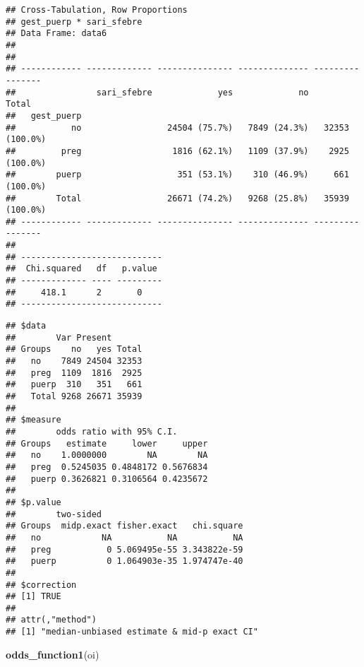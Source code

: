 \documentclass[
]{article}
\newenvironment{Shaded}{\begin{snugshade}}{\end{snugshade}}
\newcommand{\KeywordTok}[1]{\textcolor[rgb]{0.13,0.29,0.53}{\textbf{#1}}}
\newcommand{\NormalTok}[1]{#1}
\newcommand{\OperatorTok}[1]{\textcolor[rgb]{0.81,0.36,0.00}{\textbf{#1}}}
\newcommand{\StringTok}[1]{\textcolor[rgb]{0.31,0.60,0.02}{#1}}
\begin{document}
\begin{verbatim}
## Cross-Tabulation, Row Proportions  
## gest_puerp * sari_sfebre  
## Data Frame: data6  
## 
## 
## ------------ ------------- --------------- -------------- ----------------
##                sari_sfebre             yes             no            Total
##   gest_puerp                                                              
##           no                 24504 (75.7%)   7849 (24.3%)   32353 (100.0%)
##         preg                  1816 (62.1%)   1109 (37.9%)    2925 (100.0%)
##        puerp                   351 (53.1%)    310 (46.9%)     661 (100.0%)
##        Total                 26671 (74.2%)   9268 (25.8%)   35939 (100.0%)
## ------------ ------------- --------------- -------------- ----------------
## 
## ----------------------------
##  Chi.squared   df   p.value 
## ------------- ---- ---------
##     418.1      2       0    
## ----------------------------
\end{verbatim}

\begin{Shaded}
\end{Shaded}

\begin{verbatim}
## $data
##        Var Present
## Groups    no   yes Total
##   no    7849 24504 32353
##   preg  1109  1816  2925
##   puerp  310   351   661
##   Total 9268 26671 35939
## 
## $measure
##        odds ratio with 95% C.I.
## Groups   estimate     lower     upper
##   no    1.0000000        NA        NA
##   preg  0.5245035 0.4848172 0.5676834
##   puerp 0.3626821 0.3106564 0.4235672
## 
## $p.value
##        two-sided
## Groups  midp.exact fisher.exact   chi.square
##   no            NA           NA           NA
##   preg           0 5.069495e-55 3.343822e-59
##   puerp          0 1.064903e-35 1.974747e-40
## 
## $correction
## [1] TRUE
## 
## attr(,"method")
## [1] "median-unbiased estimate & mid-p exact CI"
\end{verbatim}

\begin{Shaded}
\begin{Highlighting}[]
\KeywordTok{odds_function1}\NormalTok{(oi)}
\end{Highlighting}
\end{Shaded}
\end{document}
